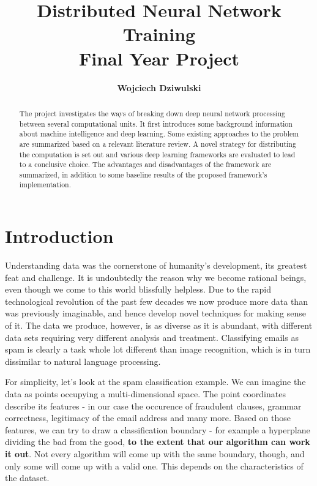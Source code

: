 \documentclass[a4paper, 11pt]{article}
\title{Distributed Neural Network Training \\ \large Final Year Project}
\author{\textbf{Wojciech Dziwulski}}
\date{}
\numberwithin{equation}{section}
\begin{document}
	
	\clearpage
	\maketitle
	\thispagestyle{empty}
	\begin{abstract}
		The project investigates the ways of breaking down deep neural network processing between several computational units. It first introduces some background information about machine intelligence and deep learning. Some existing approaches to the problem are summarized based on a relevant literature review. A novel strategy for distributing the computation is set out and various deep learning frameworks are evaluated to lead to a conclusive choice. The advantages and disadvantages of the framework are summarized, in addition to some baseline results of the proposed framework's implementation.
		
	\end{abstract}
	
	
	\newpage
	\tableofcontents 
	
	
	\newpage
	
	
	\clearpage
	
	
	\newpage
	
	\clearpage
	
	\pagestyle{wojciech}
	
	\section{Introduction}
	
	Understanding data was the cornerstone of humanity's development, its greatest feat and challenge. It is undoubtedly the reason why we become rational beings, even though we come to this world blissfully helpless. Due to the rapid technological revolution of the past few decades we now produce more data than was previously imaginable, and hence develop novel techniques for making sense of it. The data we produce, however, is as diverse as it is abundant, with different data sets requiring very different analysis and treatment. Classifying emails as spam is clearly a task whole lot different than image recognition, which is in turn dissimilar to natural language processing.
	
	For simplicity, let's look at the spam classification example. We can imagine the data as points occupying a multi-dimensional space. The point coordinates describe its features - in our case the occurence of fraudulent clauses, grammar correctness, legitimacy of the email address and many more. Based on those features, we can try to draw a classification boundary - for example a hyperplane dividing the bad from the good, \textbf{to the extent that our algorithm can work it out}. Not every algorithm will come up with the same boundary, though, and only some will come up with a valid one. This depends on the characteristics of the dataset.
	
\end{document}
